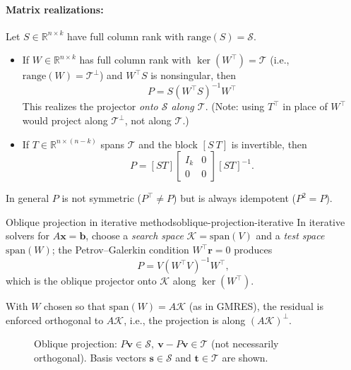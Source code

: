 \paragraph{Matrix realizations:}
Let $S\in\mathbb R^{n\times k}$ have full column rank with $\mathrm{range}(S)=\mathcal{S}$.
\begin{itemize}
    \item If $W\in\mathbb R^{n\times k}$ has full column rank with $\ker(W^\top)=\mathcal{T}$ (i.e., $\mathrm{range}(W)=\mathcal{T}^\perp$) and $W^\top S$ is nonsingular, then
          \[
              P=S(W^\top S)^{-1}W^\top
          \]
          This realizes the projector \emph{onto $\mathcal{S}$ along $\mathcal{T}$}. (Note: using $T^\top$ in place of $W^\top$ would project along $\mathcal{T}^\perp$, not along $\mathcal{T}$.)
    \item If $T\in\mathbb R^{n\times(n-k)}$ spans $\mathcal{T}$ and the block $[S\ T]$ is invertible, then
          \[
              P=[ST]
              \begin{bmatrix}
                  I_k & 0 \\
                  0   & 0
              \end{bmatrix}
              [ST]^{-1}.
          \]
\end{itemize}
In general $P$ is not symmetric ($P^\top\neq P$) but is always idempotent ($P^2=P$).

\begin{example}{Oblique projection in iterative methods}{oblique-projection-iterative}
    In iterative solvers for $A\mathbf x=\mathbf b$, choose a \emph{search space} $\mathcal K=\mathrm{span}(V)$
    and a \emph{test space} $\mathrm{span}(W)$; the Petrov--Galerkin condition $W^\top\mathbf r=0$ produces
    \[
        P=V(W^\top V)^{-1}W^\top,
    \]
    which is the oblique projector onto $\mathcal K$ along $\ker(W^\top)$.

    With $W$ chosen so that $\mathrm{span}(W)=A\mathcal K$ (as in GMRES), the residual is enforced orthogonal to $A\mathcal K$, i.e., the projection is along $(A\mathcal K)^\perp$.
\end{example}

\begin{figure}[htb]
    \centering
    
    \caption{Oblique projection: \(P\mathbf{v}\in\mathcal{S},\ \mathbf{v}-P\mathbf{v}\in\mathcal{T}\) (not necessarily orthogonal). Basis vectors \(\mathbf{s} \in \mathcal{S}\) and \(\mathbf{t} \in \mathcal{T}\) are shown.}
    \label{fig:oblique-projection}
\end{figure}
